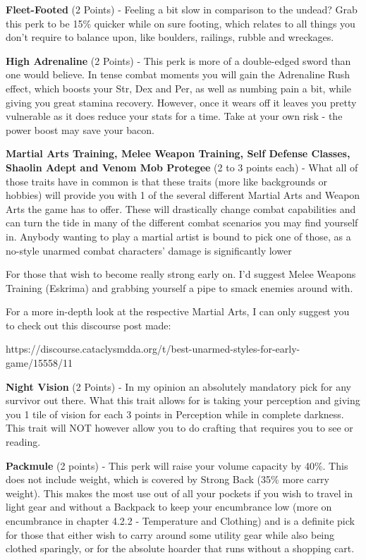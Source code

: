\textbf{Fleet-Footed} (2 Points) - Feeling a bit slow in comparison to the undead? Grab this perk to be 15\% quicker while on sure footing, which relates to all things you don't require to balance upon, like boulders, railings, rubble and wreckages.

\textbf{High Adrenaline} (2 Points) - This perk is more of a double-edged sword than one would believe. In tense combat moments you will gain the Adrenaline Rush effect, which boosts your Str, Dex and Per, as well as numbing pain a bit, while giving you great stamina recovery. However, once it wears off it leaves you pretty vulnerable as it does reduce your stats for a time. Take at your own risk - the power boost may save your bacon.

\textbf{Martial Arts Training, Melee Weapon Training, Self Defense Classes, Shaolin Adept and Venom Mob Protegee} (2 to 3 points each) - What all of those traits have in common is that these traits (more like backgrounds or hobbies) will provide you with 1 of the several different Martial Arts and Weapon Arts the game has to offer. These will drastically change combat capabilities and can turn the tide in many of the different combat scenarios you may find yourself in. Anybody wanting to play a martial artist is bound to pick one of those, as a no-style unarmed combat characters' damage is significantly lower

For those that wish to become really strong early on. I'd suggest Melee Weapons Training (Eskrima) and grabbing yourself a pipe to smack enemies around with.

For a more in-depth look at the respective Martial Arts, I can only suggest you to check out this discourse post made:

https://discourse.cataclysmdda.org/t/best-unarmed-styles-for-early-game/15558/11

\textbf{Night Vision} (2 Points) - In my opinion an absolutely mandatory pick for any survivor out there. What this trait allows for is taking your perception and giving you 1 tile of vision for each 3 points in Perception while in complete darkness. This trait will NOT however allow you to do crafting that requires you to see or reading.

\textbf{Packmule} (2 points) - This perk will raise your volume capacity by 40\%. This does not include weight, which is covered by Strong Back (35\% more carry weight). This makes the most use out of all your pockets if you wish to travel in light gear and without a Backpack to keep your encumbrance low (more on encumbrance in chapter 4.2.2 - Temperature and Clothing) and is a definite pick for those that either wish to carry around some utility gear while also being clothed sparingly, or for the absolute hoarder that runs without a shopping cart.

